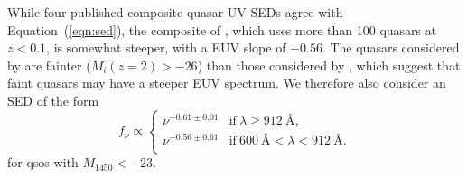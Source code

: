 \documentclass[a4paper,fleqn,usenatbib]{mnras}
\begin{document}
While four published composite quasar UV SEDs
\citep{2002ApJ...565..773T, 2001AJ....122..549V, 2012ApJ...752..162S,
  2014ApJ...794...75S} agree with Equation~(\ref{eqn:sed}), the
composite of \citet{2004ApJ...615..135S}, which uses more than 100
quasars at $z<0.1$, is somewhat steeper, with a EUV slope of $-0.56$.
The quasars considered by \citet{2004ApJ...615..135S} are fainter
($M_i(z=2)>-26$) than those considered by \citet{2015MNRAS.449.4204L},
which suggest that faint quasars may have a steeper EUV spectrum.  We
therefore also consider an SED of the form
\begin{equation}
f_\nu\propto\begin{cases}
               \nu^{-0.61\pm 0.01} & \text{if}~\lambda\geq 912~\text{\AA},\\
               \nu^{-0.56\pm 0.61} & \text{if}~600~\text{\AA}<\lambda<912~\text{\AA}.\\                
               \end{cases}
\label{eqn:sed_faint}
\end{equation}
for qsos with $M_{1450}<-23$.
\end{document}
